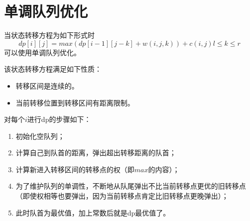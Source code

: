 \section{单调队列优化}
当状态转移方程为如下形式时
\begin{displaymath}
    dp[i][j]=max(dp[i-1][j-k]+w(i,j,k))+c(i,j) l \leq k \leq r
\end{displaymath}
可以使用单调队列优化。

该状态转移方程满足如下性质：
\begin{itemize}
    \item 转移区间是连续的。
    \item 当前转移位置到转移区间有距离限制。
\end{itemize}

对每个$i$进行dp的步骤如下：
\begin{enumerate}
    \item 初始化空队列；
    \item 计算自己到队首的距离，弹出超出转移距离的队首；
    \item 计算新进入转移区间的转移点的权（即$max$的内容）；
    \item 为了维护队列的单调性，不断地从队尾弹出不比当前转移点更优的旧转移点
    （即使权相等也要弹出，因为当前转移点肯定比旧转移点更晚弹出）；
    \item 此时队首为最优值，加上常数后就是dp最优值了。
\end{enumerate}

